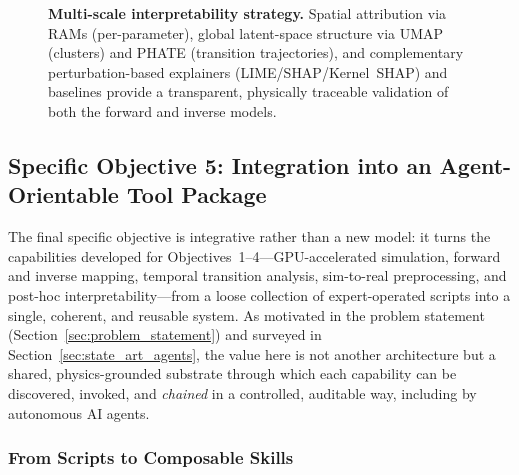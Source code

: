 \documentclass[letterpaper, 12, one column]{article}
\begin{document}
\begin{figure}[H]
{}
    \caption{\textbf{Multi-scale interpretability strategy.} Spatial attribution via RAMs (per-parameter), global latent-space structure via UMAP (clusters) and PHATE (transition trajectories), and complementary perturbation-based explainers (LIME/SHAP/Kernel~SHAP) and baselines provide a transparent, physically traceable validation of both the forward and inverse models.}
    \label{fig:interpretability_strategy}
\end{figure}

\subsection{Specific Objective 5: Integration into an Agent-Orientable Tool Package}\label{sec:agent_integration}

The final specific objective is integrative rather than a new model: it turns the capabilities developed for Objectives~1--4---GPU-accelerated simulation, forward and inverse mapping, temporal transition analysis, sim-to-real preprocessing, and post-hoc interpretability---from a loose collection of expert-operated scripts into a single, coherent, and reusable system. As motivated in the problem statement (Section~\ref{sec:problem_statement}) and surveyed in Section~\ref{sec:state_art_agents}, the value here is not another architecture but a shared, physics-grounded substrate through which each capability can be discovered, invoked, and \emph{chained} in a controlled, auditable way, including by autonomous AI agents.

\subsubsection{From Scripts to Composable Skills}
\end{document}
